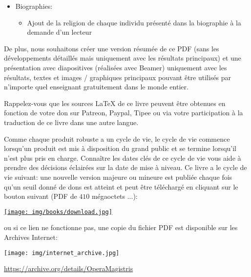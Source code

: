 \begin{itemize}
\begin{itemize}
				\item Problème du vendeur de journaux
				\item Effet coup de fouet
				\item Paradoxe de Condorcet	
				\item M\'ethode CRAFT (Computerized Relative Allocation of Facilities Technique)
				\item Options r\'eelles
				\item Capital diff\'er\'e en cas de survie (assurance vie)
				\item Indice de volatilit\'e CBOE (commenc\'e mais pas termin\'e)
				\item D\'ecès diff\'er\'e temporaire (assurance vie)
			\end{itemize}
		\item Biographies:
			\begin{itemize}
				\item Ajout de la religion de chaque individu pr\'esent\'e dans la biographie à la demande d'un lecteur
			\end{itemize}
	\end{itemize}
	De plus, nous souhaitons cr\'eer une version r\'esum\'ee de ce PDF (sans les d\'eveloppements d\'etaill\'es mais uniquement avec les r\'esultats principaux) et une pr\'esentation avec diapositives (r\'ealis\'ees avec Beamer) uniquement avec les r\'esultats, textes et images / graphiques principaux pouvant être utilis\'es par n'importe quel enseignant gratuitement dans le monde entier.
	
	Rappelez-vous que les sources \LaTeX{} de ce livre peuvent être obtenues en fonction de votre don sur Patreon, Paypal, Tipee ou via votre participation à la traduction de ce livre dans une autre langue.
	
	Comme chaque produit robuste a un cycle de vie, le cycle de vie commence lorsqu'un produit est mis à disposition du grand public et se termine lorsqu'il n'est plus pris en charge. Connaître les dates cl\'es de ce cycle de vie vous aide à prendre des d\'ecisions \'eclair\'ees sur la date de mise à niveau. Ce livre a le cycle de vie suivant: une nouvelle version majeure ou mineure est publi\'ee chaque fois qu'un seuil donn\'e de dons est atteint et peut être t\'el\'echarg\'e en cliquant sur le bouton suivant (PDF de $410$ m\'egaoctets ...):
	\begin{center}
		\href{http://www.sciences.ch/dwnldbl/telecharger.php3}{\texttt{[image: img/books/download.jpg]}}
	\end{center}
	ou si ce lien ne fonctionne pas, une copie du fichier PDF est disponible sur les Archives Internet:
	\begin{center}
		\texttt{[image: img/internet\_archive.jpg]}
	\end{center}
	\begin{center}
	\href{https://archive.org/details/OperaMagistris}{https://archive.org/details/OperaMagistris}
	\end{center}
	

